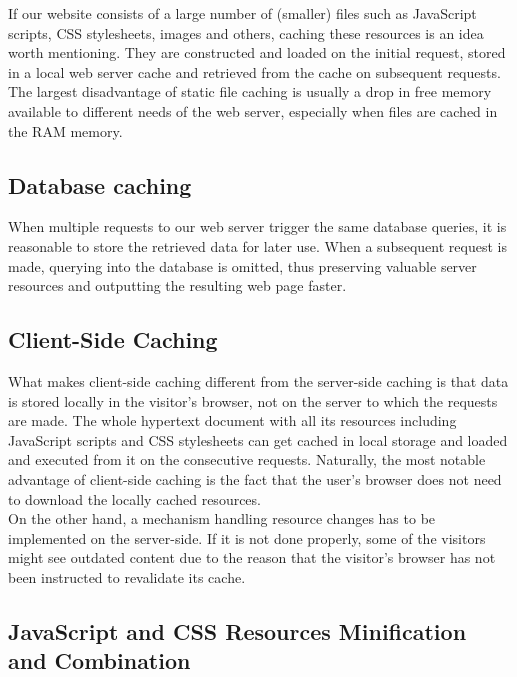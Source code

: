 If our website consists of a large number of (smaller) files such as JavaScript scripts, CSS stylesheets, images and others, caching these resources is an idea worth mentioning. They are constructed and loaded on the initial request, stored in a local web server cache and retrieved from the cache on subsequent requests.\\ 

The largest disadvantage of static file caching is usually a drop in free memory available to different needs of the web server, especially when files are cached in the RAM memory.

\subsection*{Database caching}

When multiple requests to our web server trigger the same database queries, it is reasonable to store the retrieved data for later use. When a subsequent request is made, querying into the database is omitted, thus preserving valuable server resources and outputting the resulting web page faster.


\subsection{Client-Side Caching}

What makes client-side caching different from the server-side caching is that data is stored locally in the visitor’s browser, not on the server to which the requests are made. \cite{Study:Mnot-caching} The whole hypertext document with all its resources including JavaScript scripts and CSS stylesheets can get cached in local storage and loaded and executed from it on the consecutive requests. Naturally, the most notable advantage of client-side caching is the fact that the user’s browser does not need to download the locally cached resources. \\

On the other hand, a mechanism handling resource changes has to be implemented on the server-side. If it is not done properly, some of the visitors might see outdated content due to the reason that the visitor’s browser has not been instructed to revalidate its cache.

\subsection{JavaScript and CSS Resources Minification and Combination}

